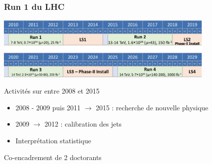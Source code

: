 \begin{frame}
\frametitle{Run 1 du LHC}

\vspace*{-0.1cm}
\begin{center}
\includegraphics[width=0.8\textwidth]{Figures/Intro/LHCrunplan_modif.png}
\end{center}

\begin{small}
\begin{maliste}
\item Activités sur \ATLAS{} entre 2008 et 2015
\vspace*{0.1cm}
\begin{itemize}
\item 2008 - 2009 puis 2011 $\rightarrow$ 2015 : recherche de nouvelle physique
\vspace*{0.05cm}
\item 2009 $\rightarrow$ 2012 : calibration des jets
\vspace*{0.05cm}
\item Interpr\'etation statistique
\end{itemize}
\vspace*{0.1cm}
\item Co-encadrement de 2 doctorants
\end{maliste}
\end{small}


\end{frame}
